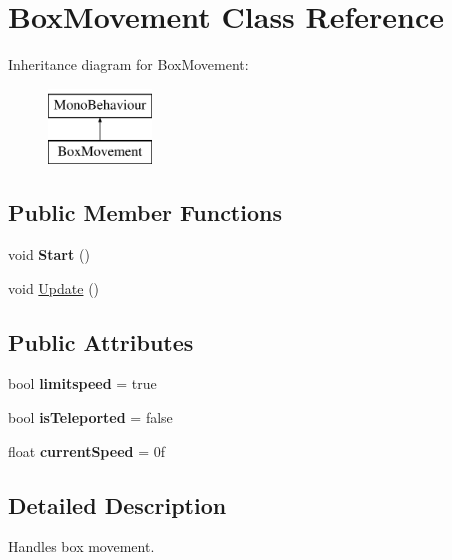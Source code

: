 \hypertarget{class_box_movement}{}\section{Box\+Movement Class Reference}
\label{class_box_movement}
Inheritance diagram for Box\+Movement\+:\begin{figure}[H]
\begin{center}
\leavevmode
\includegraphics[height=2.000000cm]{class_box_movement}
\end{center}
\end{figure}
\subsection*{Public Member Functions}
\begin{DoxyCompactItemize}
\item 
\mbox{\label{class_box_movement_a03b060c6c0cc28909fe9d197e0fd028a}} 
void {\bfseries Start} ()
\item 
void \mbox{\hyperlink{class_box_movement_ac523de4864d05c027a26c002feb0ddab}{Update}} ()
\end{DoxyCompactItemize}
\subsection*{Public Attributes}
\begin{DoxyCompactItemize}
\item 
\mbox{\label{class_box_movement_ab093a3284a637c30339cd79b52dee4ed}} 
bool {\bfseries limitspeed} = true
\item 
\mbox{\label{class_box_movement_a31cd8d25aebe904d30ae8b81fd987912}} 
bool {\bfseries is\+Teleported} = false
\item 
\mbox{\label{class_box_movement_a030be4c908d1ddf437002042704273f4}} 
float {\bfseries current\+Speed} = 0f
\end{DoxyCompactItemize}


\subsection{Detailed Description}
Handles box movement. 

